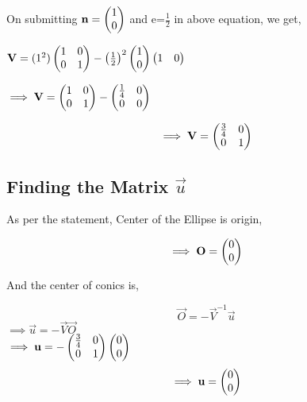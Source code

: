 \documentclass[journal,10pt,twocolumn]{article}
\begin{document}
\begin{flushleft}
On submitting $\mathbf{n}=\begin{pmatrix}1\\0\end{pmatrix}$ and e=$\frac{1}{2}$ in above equation, we get,\\
\end{flushleft}
\endcenter
\begin{center}
$\mathbf{V} =(1^2)\begin{pmatrix}1&0\\0&1\end{pmatrix}-\left(\frac{1}{2}\right)^2 \begin{pmatrix}1\\0\end{pmatrix} \begin{pmatrix}1&0\end{pmatrix}$\\  
\end{center}
\begin{center}
$\implies \mathbf{V} =\begin{pmatrix}1&0\\0&1\end{pmatrix}- \begin{pmatrix}\frac{1}{4}&0\\0&0\end{pmatrix}$\\ 
\end{center}
\begin{equation}
   \implies \mathbf{V}=\begin{pmatrix}\frac{3}{4} & 0 \\ 0 & 1\end{pmatrix}
\end{equation}
\begin{flushleft}
\subsection{Finding the Matrix $\vec{u}$}
\end{flushleft}
\vspace{0.2cm}
\begin{flushleft}
As per the statement, Center of the Ellipse is origin,
\end{flushleft}
\begin{equation}
   \implies \mathbf{O} = \begin{pmatrix}0\\0\end{pmatrix}
\end{equation}
\begin{flushleft}
And the center of conics is,\\
\end{flushleft}
\begin{equation}
    \vec{O} = -\vec{V}^{-1} \vec{u}
\end{equation}
\center
$\implies \vec{u} = -\vec{V} \vec{O}$\\
\center
$\implies \mathbf{u} = -\begin{pmatrix}\frac{3}{4}& 0\\0&1\end{pmatrix} \begin{pmatrix}0\\0\end{pmatrix}$
\vspace{0.2cm}
\begin{equation}
 \implies \mathbf{u} = \begin{pmatrix}0\\0\end{pmatrix}   
\end{equation}
\end{document}
